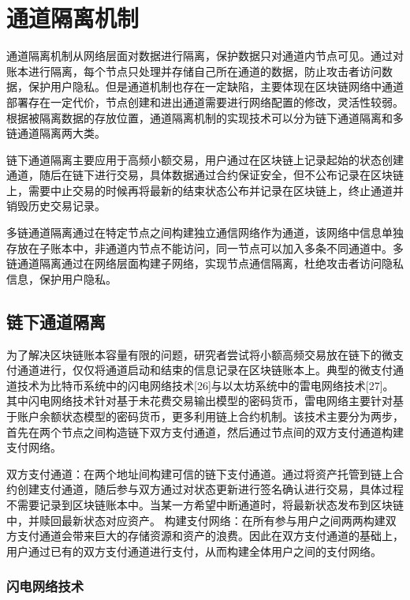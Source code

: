 \section{通道隔离机制}

通道隔离机制从网络层面对数据进行隔离，保护数据只对通道内节点可见。通过对账本进行隔离，每个节点只处理并存储自己所在通道的数据，防止攻击者访问数据，保护用户隐私。但是通道机制也存在一定缺陷，主要体现在区块链网络中通道部署存在一定代价，节点创建和进出通道需要进行网络配置的修改，灵活性较弱。根据被隔离数据的存放位置，通道隔离机制的实现技术可以分为链下通道隔离和多链通道隔离两大类。

链下通道隔离主要应用于高频小额交易，用户通过在区块链上记录起始的状态创建通道，随后在链下进行交易，具体数据通过合约保证安全，但不公布记录在区块链上，需要中止交易的时候再将最新的结束状态公布并记录在区块链上，终止通道并销毁历史交易记录。

多链通道隔离通过在特定节点之间构建独立通信网络作为通道，该网络中信息单独存放在子账本中，非通道内节点不能访问，同一节点可以加入多条不同通道中。多链通道隔离通过在网络层面构建子网络，实现节点通信隔离，杜绝攻击者访问隐私信息，保护用户隐私。

\subsection{链下通道隔离}

为了解决区块链账本容量有限的问题，研究者尝试将小额高频交易放在链下的微支付通道进行，仅仅将通道启动和结束的信息记录在区块链账本上。典型的微支付通道技术为比特币系统中的闪电网络技术[26]与以太坊系统中的雷电网络技术[27]。其中闪电网络技术针对基于未花费交易输出模型的密码货币，雷电网络主要针对基于账户余额状态模型的密码货币，更多利用链上合约机制。该技术主要分为两步，首先在两个节点之间构造链下双方支付通道，然后通过节点间的双方支付通道构建支付网络。

双方支付通道：在两个地址间构建可信的链下支付通道。通过将资产托管到链上合约创建支付通道，随后参与双方通过对状态更新进行签名确认进行交易，具体过程不需要记录到区块链账本中。当某一方希望中断通道时，将最新状态发布到区块链中，并赎回最新状态对应资产。
构建支付网络：在所有参与用户之间两两构建双方支付通道会带来巨大的存储资源和资产的浪费。因此在双方支付通道的基础上，用户通过已有的双方支付通道进行支付，从而构建全体用户之间的支付网络。

\subsubsection{闪电网络技术}

